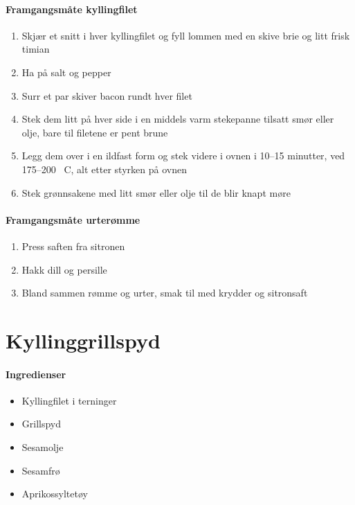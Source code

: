 \documentclass[12pt,a4paper]{book}
\begin{document}
\paragraph{Framgangsmåte kyllingfilet}
\begin{enumerate}[noitemsep]
	\item Skjær et snitt i hver kyllingfilet og fyll lommen med en skive brie og litt frisk timian
	\item Ha på salt og pepper
	\item Surr et par skiver bacon rundt hver filet
	\item Stek dem litt på hver side i en middels varm stekepanne tilsatt smør eller olje, bare til filetene er pent brune
	\item Legg dem over i en ildfast form og stek videre i ovnen i 10--15 minutter, ved 175--200 \degree~C, alt etter styrken på ovnen
	\item Stek grønnsakene med litt smør eller olje til de blir knapt møre
\end{enumerate}


\paragraph{Framgangsmåte urterømme}
\begin{enumerate}[noitemsep]
	\item Press saften fra sitronen
	\item Hakk dill og persille
	\item Bland sammen rømme og urter, smak til med krydder og sitronsaft
\end{enumerate}
\clearpage{}
\clearpage{}\section{﻿Kyllinggrillspyd}

\paragraph{Ingredienser}
\begin{itemize}[noitemsep]
	\item Kyllingfilet i terninger
	\item Grillspyd
	\item Sesamolje
	\item Sesamfrø
	\item Aprikossyltetøy
\end{itemize}
\end{document}
